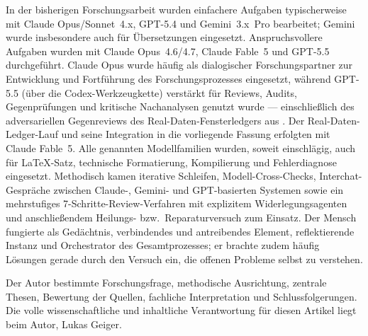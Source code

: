 \documentclass[12pt,a4paper]{article}
\theoremstyle{definition}
\theoremstyle{remark}
\begin{document}
\begin{sloppypar}
\noindent
In der bisherigen Forschungsarbeit wurden einfachere Aufgaben typischerweise
mit Claude Opus/Sonnet~4.x, GPT-5.4 und Gemini~3.x~Pro bearbeitet; Gemini
wurde insbesondere auch für Übersetzungen eingesetzt. Anspruchsvollere
Aufgaben wurden mit Claude Opus~4.6/4.7, Claude Fable~5 und GPT-5.5
durchgeführt. Claude Opus wurde häufig als dialogischer Forschungspartner
zur Entwicklung und Fortführung des Forschungsprozesses eingesetzt, während
GPT-5.5 (über die Codex-Werkzeugkette) verstärkt für Reviews, Audits,
Gegenprüfungen und kritische Nachanalysen genutzt wurde --- einschließlich
des adversariellen Gegenreviews des Real-Daten-Fensterledgers aus
. Der Real-Daten-Ledger-Lauf und seine
Integration in die vorliegende Fassung erfolgten mit Claude Fable~5. Alle
genannten Modellfamilien wurden, soweit einschlägig, auch für \LaTeX-Satz,
technische Formatierung, Kompilierung und Fehlerdiagnose eingesetzt.
Methodisch kamen iterative Schleifen, Modell-Cross-Checks,
Interchat-Gespräche zwischen Claude-, Gemini- und GPT-basierten Systemen
sowie ein mehrstufiges 7-Schritte-Review-Verfahren mit explizitem
Widerlegungsagenten und anschließendem Heilungs- bzw.\ Reparaturversuch zum
Einsatz. Der Mensch fungierte als Gedächtnis, verbindendes und antreibendes
Element, reflektierende Instanz und Orchestrator des Gesamtprozesses; er
brachte zudem häufig Lösungen gerade durch den Versuch ein, die offenen
Probleme selbst zu verstehen.
\end{sloppypar}

\medskip

\noindent
Der Autor bestimmte Forschungsfrage, methodische Ausrichtung, zentrale
Thesen, Bewertung der Quellen, fachliche Interpretation und
Schlussfolgerungen. Die volle wissenschaftliche und inhaltliche
Verantwortung für diesen Artikel liegt beim Autor, Lukas Geiger.

\normalsize

\end{document}

